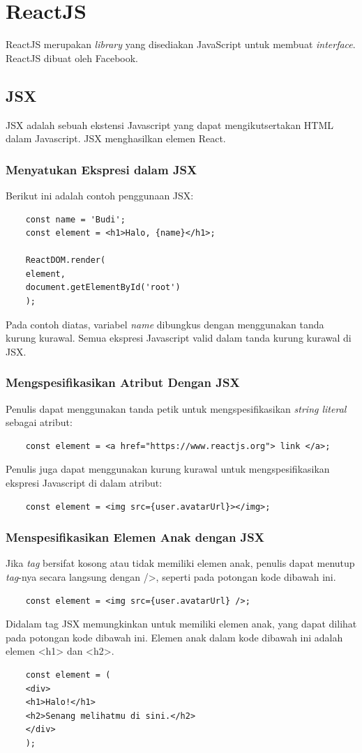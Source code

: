 \section{ReactJS}
ReactJS merupakan \textit{library} yang disediakan JavaScript untuk membuat \textit{interface}. ReactJS dibuat oleh Facebook\cite{reactjsConcept}. 
\subsection{JSX}
JSX adalah sebuah ekstensi Javascript yang dapat mengikutsertakan HTML dalam Javascript. JSX menghasilkan elemen React. 
\subsubsection{Menyatukan Ekspresi dalam JSX}
Berikut ini adalah contoh penggunaan JSX:
\begin{lstlisting}
	const name = 'Budi';
	const element = <h1>Halo, {name}</h1>;
	
	ReactDOM.render(
	element,
	document.getElementById('root')
	);
\end{lstlisting}
Pada contoh diatas, variabel \textit{name} dibungkus dengan menggunakan tanda kurung kurawal. Semua ekspresi Javascript valid dalam tanda kurung kurawal di JSX. 
\subsubsection{Mengspesifikasikan Atribut Dengan JSX}
Penulis dapat menggunakan tanda petik untuk mengspesifikasikan \textit{string literal} sebagai atribut:
\begin{lstlisting}
	const element = <a href="https://www.reactjs.org"> link </a>;
\end{lstlisting}
 Penulis juga dapat menggunakan kurung kurawal untuk mengspesifikasikan ekspresi Javascript di dalam atribut:
 \begin{lstlisting}
 	const element = <img src={user.avatarUrl}></img>;
 \end{lstlisting}

\subsubsection{Menspesifikasikan Elemen Anak dengan JSX}
Jika \textit{tag} bersifat kosong atau tidak memiliki elemen anak, penulis dapat menutup \textit{tag}-nya secara langsung dengan />, seperti pada potongan kode dibawah ini.
\begin{lstlisting}
	const element = <img src={user.avatarUrl} />;
\end{lstlisting}
Didalam tag JSX memungkinkan untuk memiliki elemen anak, yang dapat dilihat pada potongan kode dibawah ini. Elemen anak dalam kode dibawah ini adalah elemen <h1> dan <h2>.
\begin{lstlisting}
	const element = (
	<div>
	<h1>Halo!</h1>
	<h2>Senang melihatmu di sini.</h2>
	</div>
	);
\end{lstlisting}

